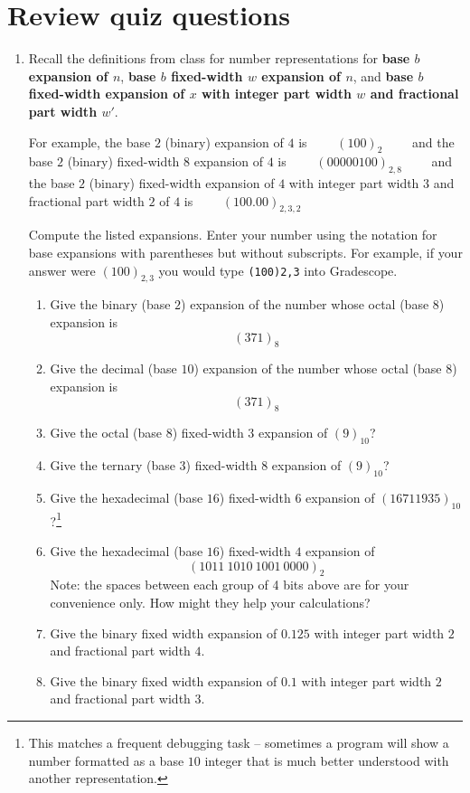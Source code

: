 \documentclass[12pt, oneside]{article}
\begin{document}
\section*{Review quiz questions}
\begin{enumerate}

\item Recall the definitions from class for number representations for {\bf base $b$ expansion of $n$},
{\bf  base $b$ fixed-width $w$ expansion of $n$}, and {\bf base $b$ fixed-width expansion of $x$ 
with integer part width $w$ and fractional part width $w'$}.

For example, the base $2$ (binary) expansion of $4$ is 
$\qquad
(100)_2 \qquad$
and the base $2$ (binary) fixed-width $8$ expansion of $4$ is
$\qquad
(00000100)_{2,8} \qquad$
and the base $2$ (binary) fixed-width expansion of $4$ with integer part width $3$ and fractional
part width $2$ of $4$ is
$\qquad
(100.00)_{2,3,2} \qquad$

Compute the listed expansions.  Enter your number using the notation for base 
expansions with parentheses but without subscripts. For example, 
if your answer were $(100)_{2,3}$
you would type \texttt{(100)2,3} into Gradescope.

\begin{enumerate}
\item Give the binary (base $2$) expansion of the number whose octal (base $8$) expansion is
\[
(371)_8
\]
\item Give the decimal (base $10$) expansion of the number whose octal (base $8$) expansion is
\[
(371)_8
\]
\item Give the octal (base $8$) fixed-width $3$ expansion of $(9)_{10}$?
\item Give the ternary (base $3$) fixed-width $8$ expansion of $(9)_{10}$?
\item Give the hexadecimal (base $16$) fixed-width $6$ expansion of
$(16711935)_{10}$?\footnote{This matches a frequent debugging task --
sometimes a program will show a number formatted as a base $10$
integer that is much better understood with another representation.}
\item Give the hexadecimal (base $16$) fixed-width $4$ expansion of
$$(1011~ 1010 ~ 1001~ 0000 )_2$$
Note: the spaces between each group of 4 bits above are for your convenience only.  How
might they help your calculations?
\item Give the binary fixed width expansion of $0.125$ with integer part width $2$ and 
fractional part width $4$.
\item Give the binary fixed width expansion of $0.1$ with integer part width $2$ and 
fractional part width $3$.
\end{enumerate}


\end{enumerate}
\end{document}
